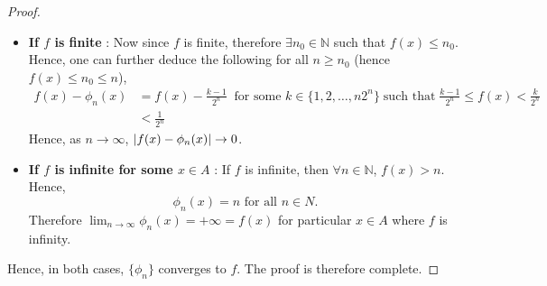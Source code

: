 \documentclass{article}
\theoremstyle{definition}
\theoremstyle{remark}
\theoremstyle{definition}
\theoremstyle{definition}
\theoremstyle{definition}
\DeclarePairedDelimiter\abs{\lvert}{\rvert}
\newcommand{\N}{\mathbb{N}}
\begin{document}
\begin{proof}
	\begin{itemize}
		\item {\textbf{If $ f $ is finite} : Now since $ f $ is finite, therefore $ \exists n_0 \in \N$ such that $ f(x)\le n_0 $. Hence, one can further deduce the following for all $ n\ge n_0 $ (hence $ f(x) \le n_0 \le n$),
			\begin{equation*}
				\begin{split}
					f(x) - \phi_n(x) &=  f(x) - \frac{k-1}{2^{n}}\;\;\text{for some }k\in\{1,2,\dots,n2^n\}\;\text{such that}\;\frac{k-1}{2^n}\le f(x)< \frac{k}{2^n}\\
					&<\frac{1}{2^n}
				\end{split}
			\end{equation*}
			Hence, as $ n\to \infty $, $ \abs{f(x) - \phi_n(x)} \to 0 $. 
		}
		\item {\textbf{If $ f $ is infinite for some $ x\in A $} : If $ f $ is infinite, then $ \forall n\in \N$, $ f(x) > n$. Hence,
			\[\phi_n(x) = n\text{ for all }n\in N.\]
			Therefore $ \lim_{n\to \infty} \phi_{n}(x) = +\infty = f(x) $ for particular $ x\in A $ where $ f $ is infinity.
		}
	\end{itemize}
	Hence, in both cases, $ \{\phi_n\} $ converges to $ f $. The proof is therefore complete.
\end{proof}
\hrulefill
\end{document}
